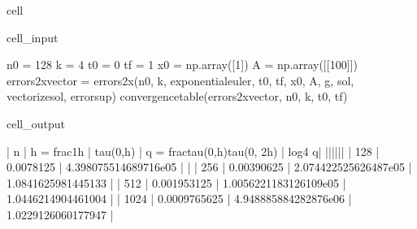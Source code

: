 \documentclass[letterpaper,10pt,english]{jupyterBook}
\begin{document}
\begin{sphinxuseclass}{cell}\begin{sphinxVerbatimInput}

\begin{sphinxuseclass}{cell_input}
\begin{sphinxVerbatim}[commandchars=\\\{\}]
n0 = 128
k = 4
t0 = 0
tf = 1
x0 = np.array([1])
A = np.array([[100]])
errors\PYGZus{}2x\PYGZus{}vector = errors\PYGZus{}2x(n0, k, exponential\PYGZus{}euler, t0, tf, x0, A, g, sol, vectorize\PYGZus{}sol, error\PYGZus{}sup)
convergence\PYGZus{}table(errors\PYGZus{}2x\PYGZus{}vector, n0, k, t0, tf)
\end{sphinxVerbatim}

\end{sphinxuseclass}\end{sphinxVerbatimInput}
\begin{sphinxVerbatimOutput}

\begin{sphinxuseclass}{cell_output}
\begin{sphinxVerbatim}[commandchars=\\\{\}]
| n | h = \PYGZdl{}\PYGZbs{}frac\PYGZob{}1\PYGZcb{}\PYGZob{}h\PYGZcb{}\PYGZdl{} | \PYGZdl{}\PYGZbs{}tau(0,h)\PYGZdl{} | q = \PYGZdl{}\PYGZbs{}frac\PYGZob{}tau(0,h)\PYGZcb{}\PYGZob{}tau(0, 2h)\PYGZcb{}\PYGZdl{} | \PYGZdl{}log\PYGZus{}4 \PYGZca{}q\PYGZdl{}|
|\PYGZhy{}\PYGZhy{}\PYGZhy{}|\PYGZhy{}\PYGZhy{}\PYGZhy{}\PYGZhy{}\PYGZhy{}\PYGZhy{}\PYGZhy{}\PYGZhy{}\PYGZhy{}\PYGZhy{}\PYGZhy{}\PYGZhy{}\PYGZhy{}\PYGZhy{}\PYGZhy{}\PYGZhy{}\PYGZhy{}|\PYGZhy{}\PYGZhy{}\PYGZhy{}\PYGZhy{}\PYGZhy{}\PYGZhy{}\PYGZhy{}\PYGZhy{}\PYGZhy{}\PYGZhy{}\PYGZhy{}|\PYGZhy{}\PYGZhy{}\PYGZhy{}\PYGZhy{}\PYGZhy{}\PYGZhy{}\PYGZhy{}\PYGZhy{}\PYGZhy{}\PYGZhy{}\PYGZhy{}\PYGZhy{}\PYGZhy{}\PYGZhy{}\PYGZhy{}\PYGZhy{}\PYGZhy{}\PYGZhy{}\PYGZhy{}\PYGZhy{}\PYGZhy{}\PYGZhy{}\PYGZhy{}\PYGZhy{}\PYGZhy{}\PYGZhy{}\PYGZhy{}\PYGZhy{}\PYGZhy{}\PYGZhy{}\PYGZhy{}\PYGZhy{}\PYGZhy{}|\PYGZhy{}\PYGZhy{}\PYGZhy{}\PYGZhy{}\PYGZhy{}\PYGZhy{}\PYGZhy{}|
 | 128 | 0.0078125 | 4.398075514689716e\PYGZhy{}05 | \PYGZhy{} | 
 | 256 | 0.00390625 | 2.074422525626487e\PYGZhy{}05 | 1.0841625981445133 | 
 | 512 | 0.001953125 | 1.0056221183126109e\PYGZhy{}05 | 1.0446214904461004 | 
 | 1024 | 0.0009765625 | 4.948885884282876e\PYGZhy{}06 | 1.0229126060177947 | 
\end{sphinxVerbatim}

\end{sphinxuseclass}\end{sphinxVerbatimOutput}

\end{sphinxuseclass}
\end{document}
